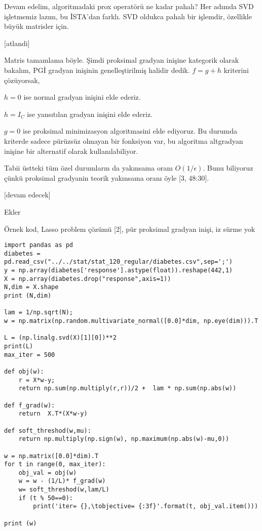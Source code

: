 \documentclass[12pt,fleqn]{article}\usepackage{../../common}
\begin{document}
Devam edelim, algoritmadaki prox operatörü ne kadar pahalı? Her adımda SVD
işletmemiz lazım, bu İSTA'dan farklı. SVD oldukca pahalı bir işlemdir,
özellikle büyük matrisler için. 

[atlandi]

Matris tamamlama böyle. Şimdi proksimal gradyan inişine kategorik olarak
bakalım, PGİ gradyan inişinin genelleştirilmiş halidir dedik. $f = g + h$
kriterini çözüyorsak, 

$h=0$ ise normal gradyan inişini elde ederiz. 

$h = I_C$ ise yansıtılan gradyan inişini elde ederiz. 

$g=0$ ise proksimal minimizasyon algoritmasini elde ediyoruz. Bu durumda
kriterde sadece pürüzsüz olmayan bir fonksiyon var, bu algoritma altgradyan
inişine bir alternatif olarak kullanılabiliyor. 

Tabii üstteki tüm özel durumların da yakınsama oranı $O(1/\epsilon)$. Bunu
biliyoruz çünkü proksimal gradyanin teorik yakınsama oranı öyle [3,
48:30]. 









[devam edecek]

Ekler

Örnek kod, Lasso problem çözümü [2], pür proksimal gradyan inişi, iz sürme yok

\begin{verbatim}
import pandas as pd
diabetes = pd.read_csv("../../stat/stat_120_regular/diabetes.csv",sep=';')
y = np.array(diabetes['response'].astype(float)).reshape(442,1)
X = np.array(diabetes.drop("response",axis=1))
N,dim = X.shape
print (N,dim)

lam = 1/np.sqrt(N);
w = np.matrix(np.random.multivariate_normal([0.0]*dim, np.eye(dim))).T

L = (np.linalg.svd(X)[1][0])**2
print(L)
max_iter = 500

def obj(w):
    r = X*w-y;
    return np.sum(np.multiply(r,r))/2 +  lam * np.sum(np.abs(w))

def f_grad(w):
    return  X.T*(X*w-y) 

def soft_threshod(w,mu):
    return np.multiply(np.sign(w), np.maximum(np.abs(w)-mu,0))  

w = np.matrix([0.0]*dim).T
for t in range(0, max_iter):
    obj_val = obj(w)
    w = w - (1/L)* f_grad(w)
    w= soft_threshod(w,lam/L)    
    if (t % 50==0):
        print('iter= {},\tobjective= {:3f}'.format(t, obj_val.item()))

print (w)
\end{verbatim}
\end{document}
